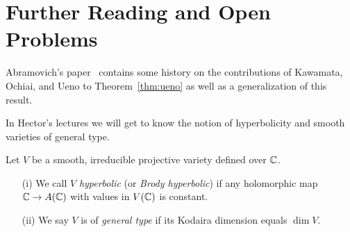 \section{Further Reading and Open Problems}


Abramovich's paper~\cite{abramovich} contains some history on the
contributions of Kawamata, Ochiai, and Ueno to Theorem~\ref{thm:ueno}
as well as a generalization of this result.



In Hector's lectures we will get to know the notion of hyperbolicity
and smooth varieties of general type.

\begin{definition}
  Let $V$ be a smooth, irreducible projective variety defined over ${\mathbb{C}}$.
  \begin{enumerate}
  \item [(i)] We call $V$ \emph{hyperbolic} (or \emph{Brody
      hyperbolic}) if
    any holomorphic map ${\mathbb{C}} \rightarrow A({\mathbb{C}})$ with values in
    $V({\mathbb{C}})$ is
    constant.
  \item[(ii)] We say $V$ is of \emph{general type} if its
    Kodaira dimension equals $\dim V$. 
  \end{enumerate}
\end{definition}




